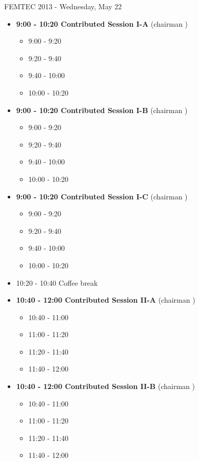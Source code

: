 \documentclass[10pt, A4]{article}%
\begin{document}
\centerline{\huge FEMTEC 2013 - Wednesday, May 22}
\vspace{4mm}

\begin{itemize}    
  \item {\bf 9:00 - 10:20 Contributed Session I-A} (chairman ) 
  \begin{itemize}
    \item 9:00 - 9:20 
    \item 9:20 - 9:40 
    \item 9:40 - 10:00 
    \item 10:00 - 10:20  
  \end{itemize}
  \item {\bf 9:00 - 10:20 Contributed Session I-B} (chairman ) 
  \begin{itemize}
    \item 9:00 - 9:20 
    \item 9:20 - 9:40 
    \item 9:40 - 10:00 
    \item 10:00 - 10:20      
  \end{itemize}
    \item {\bf 9:00 - 10:20 Contributed Session I-C} (chairman ) 
  \begin{itemize}
    \item 9:00 - 9:20 
    \item 9:20 - 9:40 
    \item 9:40 - 10:00 
    \item 10:00 - 10:20      
  \end{itemize}
  \item 10:20 - 10:40 Coffee break
  \item {\bf 10:40 - 12:00 Contributed Session II-A} (chairman ) 
  \begin{itemize}
    \item 10:40 - 11:00
    \item 11:00 - 11:20 
    \item 11:20 - 11:40 
    \item 11:40 - 12:00 
  \end{itemize}
  \item {\bf 10:40 - 12:00 Contributed Session II-B} (chairman ) 
  \begin{itemize}
    \item 10:40 - 11:00
    \item 11:00 - 11:20 
    \item 11:20 - 11:40 
    \item 11:40 - 12:00  

\end{itemize}
\end{itemize}
\end{document}
